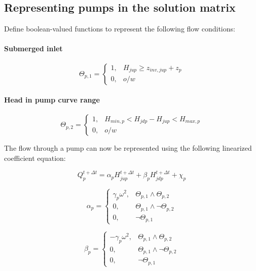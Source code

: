 \documentclass[11pt]{article}
\begin{document}
\subsection{Representing pumps in the solution matrix}

Define boolean-valued functions to represent the following flow conditions:

\paragraph{Submerged inlet}

\begin{equation}
  \Theta_{p,1} =
  \begin{cases}
    1, & H_{jup} \geq z_{inv,jup} + z_p  \\
    0, & o/w
  \end{cases}
\end{equation}

\paragraph{Head in pump curve range}

\begin{equation}
  \Theta_{p,2} =
  \begin{cases}
    1, &  H_{min,p} < H_{jdp} - H_{jup} <  H_{max,p} \\
    0, & o/w
  \end{cases}
\end{equation}

The flow through a pump can now be represented using the following linearized
coefficient equation:

\begin{equation}
  \boxed{
 Q_{p}^{t + \Delta t} = \alpha_{p} H_{jup}^{t + \Delta t} + \beta_{p} H_{jdp}^{t + \Delta t} + \chi_{p} 
 }
\end{equation}

\begin{equation}
  \boxed{
  \alpha_{p} =
  \begin{cases}
   \gamma_p \omega^2, & \Theta_{p,1} \land \Theta_{p,2}\\
   0, & \Theta_{p,1} \land \lnot \Theta_{p,2}\\
   0, & \lnot \Theta_{p,1}
  \end{cases}
  }
\end{equation}

\begin{equation}
  \boxed{
  \beta_{p} =
  \begin{cases}
   -\gamma_p \omega^2, & \Theta_{p,1} \land \Theta_{p,2}\\
   0, & \Theta_{p,1} \land \lnot \Theta_{p,2}\\
   0, & \lnot \Theta_{p,1}
  \end{cases}
  }
\end{equation}
\end{document}
